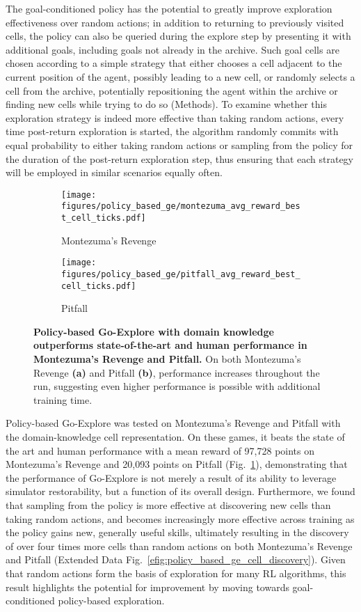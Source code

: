 \documentclass{nature}
\begin{document}
The goal-conditioned policy has the potential to greatly improve exploration effectiveness over random actions; in addition to returning to previously visited cells, the policy can also be queried during the explore step by presenting it with additional goals, including goals not already in the archive.
Such goal cells are chosen according to a simple strategy that either chooses a cell adjacent to the current position of the agent, possibly leading to a new cell, or randomly selects a cell from the archive, potentially repositioning the agent within the archive or finding new cells while trying to do so (Methods).
To examine whether this exploration strategy is indeed more effective than taking random actions, every time post-return exploration is started, the algorithm randomly commits with equal probability to either taking random actions or sampling from the policy for the duration of the post-return exploration step, thus ensuring that each strategy will be employed in similar scenarios equally often.

\begin{figure}
    \centering
    \begin{subfigure}[t]{0.45\textwidth}
        \centering
        \texttt{[image: figures/policy\_based\_ge/montezuma\_avg\_reward\_best\_cell\_ticks.pdf]}
        \caption{Montezuma's Revenge}
    \end{subfigure}\begin{subfigure}[t]{0.45\textwidth}
        \centering
        \texttt{[image: figures/policy\_based\_ge/pitfall\_avg\_reward\_best\_cell\_ticks.pdf]}
        \caption{Pitfall}
    \end{subfigure}\caption{\textbf{Policy-based Go-Explore with domain knowledge outperforms state-of-the-art and human performance in Montezuma's Revenge and Pitfall.} 
    On both Montezuma's Revenge \textbf{(a)} and Pitfall \textbf{(b)}, performance increases throughout the run, suggesting even higher performance is possible with additional training time.
    }
    \label{fig:policy_ge}
\end{figure}

Policy-based Go-Explore was tested on Montezuma's Revenge and Pitfall with the domain-knowledge cell representation.
On these games, it beats the state of the art and human performance with a mean reward of 97,728 points on Montezuma's Revenge and 20,093 points on Pitfall (Fig.~\ref{fig:policy_ge}), demonstrating that the performance of Go-Explore is not merely a result of its ability to leverage simulator restorability, but a function of its overall design.
Furthermore, we found that sampling from the policy is more effective at discovering new cells than taking random actions, and becomes increasingly more effective across training as the policy gains new, generally useful skills,
ultimately resulting in the discovery of over four times more cells than random actions on both Montezuma's Revenge and Pitfall (Extended Data Fig.~\ref{efig:policy_based_ge_cell_discovery}).
Given that random actions form the basis of exploration for many RL algorithms, this result highlights the potential for improvement by moving towards goal-conditioned policy-based exploration.
\end{document}
